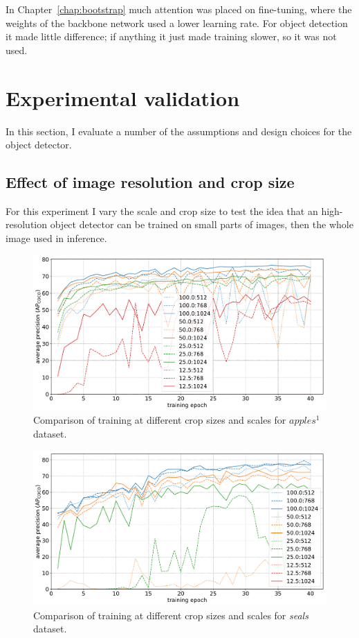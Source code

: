 In Chapter~\ref{chap:bootstrap} much attention was placed on fine-tuning, where the weights of the backbone network used a lower learning rate. For object detection it made little difference; if anything it just made training slower, so it was not used.


\section {Experimental validation}
\label{sec:experimental_validation}

In this section, I evaluate a number of the assumptions and design choices for the object detector.

\subsection {Effect of image resolution and crop size}
\label{sec:scale_crop}

For this experiment I vary the scale and crop size to test the idea that an high-resolution object detector can be trained on small parts of images, then the whole image used in inference.

\begin{figure}[htb]
  \centering
  \includegraphics[width=1.0\linewidth]{charts/training/crops_scales/penguins.pdf}
  \caption{Comparison of training at different crop sizes and scales for $apples^1$ dataset. }  
  \label{fig:apples_crop_scale}
\end{figure}

 
\begin{figure}[htb]
  \centering
  \includegraphics[width=1.0\linewidth]{charts/training/crops_scales/seals.pdf}
  \caption{Comparison of training at different crop sizes and scales for \emph{seals} dataset. }  
  \label{fig:seals_crop_scale}
\end{figure}


